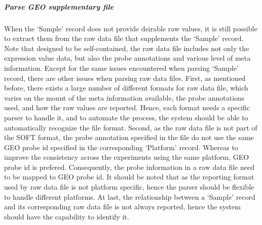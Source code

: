 \subparagraph{\textit{Parse GEO supplementary file}}

When the `Sample' record does not provide deirable raw values, it is still
possible to extract them from the raw data file that supplements the `Sample'
record.
%
Note that designed to be self-contained, the raw data file includes not only
the expression value data, but also the probe annotations and various level
of meta information.
%
Except for the same issues encountered when parsing `Sample' record, there
are other issues when parsing raw data files.
First, as mentioned before, there exists a large number of different formats
for raw data file, which varies on the mount of the meta information
available, the probe annotations used, and how the raw values are reported.
%
Hence, each format needs a specific parser to handle it, and to automate the
process, the system should be able to automatically recognize the file format.
Second, as the raw data file is not part of the SOFT format, the probe
annotation specified in the file do not use the same GEO probe id specified in
the corresponding `Platform' record.
%
Whereas to improve the consistency across the experiments using the same
platform, GEO probe id is prefered.
%
Consequently, the probe information in a raw data file need to be mapped to
GEO probe id.
It should be noted that as the reporting format used by raw data file is not
platform specific, hence the parser should be flexible to handle different
platforms.
%
At last, the relationship between a `Sample' record and its corresponding
raw data file is not always reported, hence the system should have the
capability to identify it.


